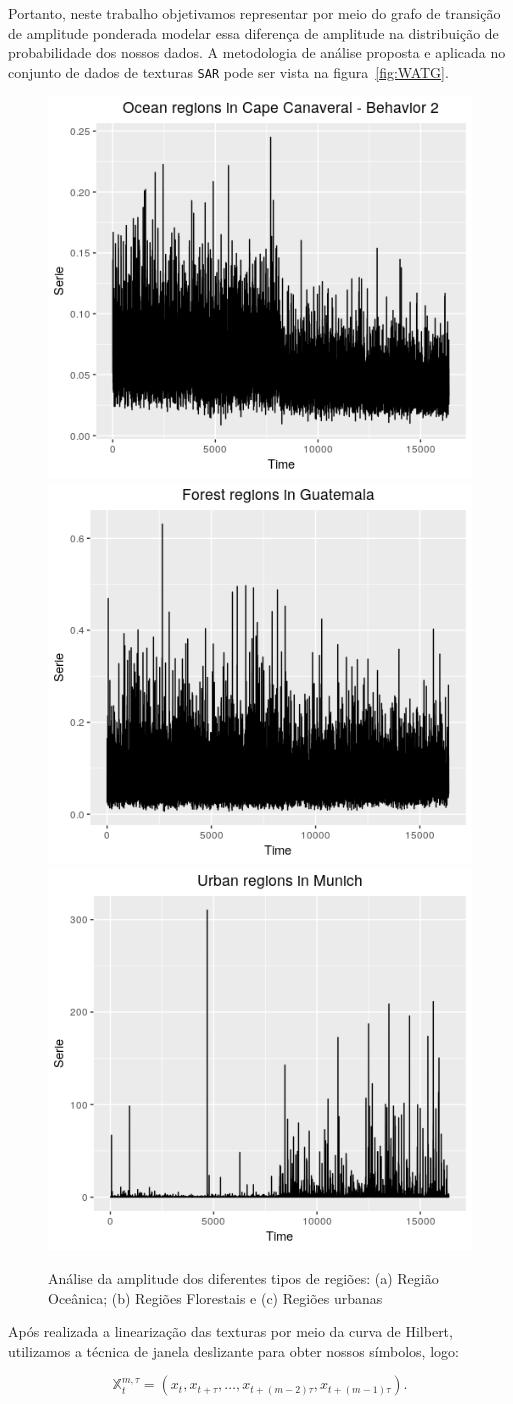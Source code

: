 \documentclass[12pt]{article}
\begin{document}
Portanto, neste trabalho objetivamos representar por meio do grafo de transição de amplitude ponderada modelar essa diferença de amplitude na distribuição de probabilidade dos nossos dados.
A metodologia de análise proposta e aplicada no conjunto de dados de texturas \texttt{SAR} pode ser vista na figura~\ref{fig:WATG}.

\begin{figure}[!h]
\centering
\includegraphics[width=.32\linewidth]{Figures/cape2_hilbert.png}
\includegraphics[width=.32\linewidth]{Figures/forestGuatemala_hilbert.png}
\includegraphics[width=.32\linewidth]{Figures/munich_hilbert.png}
\caption{Análise da amplitude dos diferentes tipos de regiões: (a) Região Oceânica; (b) Regiões Florestais e (c) Regiões urbanas}
\label{fig:AmplitudeSAR}
\end{figure}

Após realizada a linearização das texturas por meio da curva de Hilbert, utilizamos a técnica de janela deslizante para obter nossos símbolos, logo:

\begin{equation}
    \mathbb{X}_t^{m,\tau} = (x_{t}, x_{t+\tau},\ldots, x_{t+(m-2)\tau} ,x_{t+(m-1)\tau}).
\end{equation}
\end{document}
